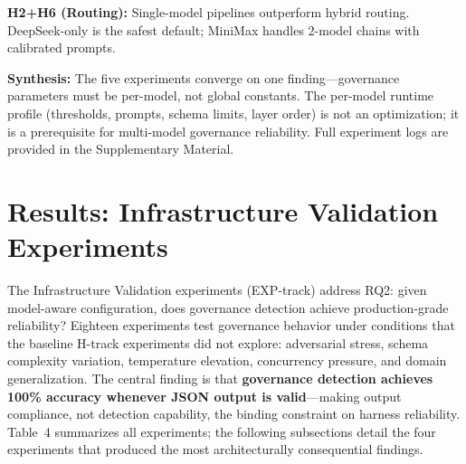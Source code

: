 \documentclass[11pt,a4paper]{article}
\begin{document}
\textbf{H2+H6 (Routing):} Single-model pipelines outperform hybrid routing. DeepSeek-only is the safest default; MiniMax handles 2-model chains with calibrated prompts.

\textbf{Synthesis:} The five experiments converge on one finding---governance parameters must be per-model, not global constants. The per-model runtime profile (thresholds, prompts, schema limits, layer order) is not an optimization; it is a prerequisite for multi-model governance reliability. Full experiment logs are provided in the Supplementary Material.

\section{Results: Infrastructure Validation Experiments}\label{sec:infra-experiments}

The Infrastructure Validation experiments (EXP-track) address RQ2: given model-aware configuration, does governance detection achieve production-grade reliability? Eighteen experiments test governance behavior under conditions that the baseline H-track experiments did not explore: adversarial stress, schema complexity variation, temperature elevation, concurrency pressure, and domain generalization. The central finding is that \textbf{governance detection achieves 100\% accuracy whenever JSON output is valid}---making output compliance, not detection capability, the binding constraint on harness reliability. Table~4 summarizes all experiments; the following subsections detail the four experiments that produced the most architecturally consequential findings.
\end{document}
